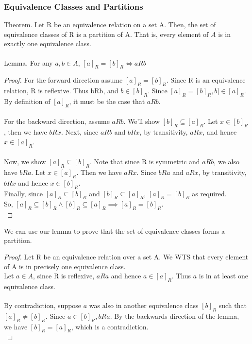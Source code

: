 \documentclass{article}
\begin{document}
\subsubsection{Equivalence Classes and Partitions}
Theorem. Let R be an equivalence relation on a set A. Then, the set of equivalence classes of R is a partition of A. That is, every element of $A$ is in exactly one equivalence class.
\\\\
Lemma. For any $a, b \in A$, $[a]_R = [b]_R \iff aRb$
\begin{proof}
For the forward direction assume $[a]_R = [b]_R$. Since R is an equivalence relation, R is reflexive. Thus bRb, and $b \in [b]_R$. Since $[a]_R = [b]_R, b ] \in [a]_R$. By definition of $[a]_R$, it must be the case that $aRb$.\\
\\
For the backward direction, assume $aRb$. We'll show $[b]_R \subseteq [a]_R.$ Let $x \in [b]_R$, then we have $bRx$. Next, since $aRb$ and $bRx$, by transitivity, $aRx$, and hence $x \in [a]_R$.\\
\\
Now, we show $[a]_R \subseteq [b]_R$. Note that since R is symmetric and $aRb$,  we also have $bRa$. Let $x \in [a]_R$. Then we have $aRx$. Since $bRa$ and $aRx$, by transitivity, $bRx$ and hence $x \in [b]_R$.\\
Finally, since $[a]_R \subseteq [b]_R$ and $[b]_R \subseteq [a]_R$, $[a]_R = [b]_R$ as required.
\\
So, $[a]_R \subseteq [b]_R \land [b]_R \subseteq [a]_R \implies [a]_R = [b]_R$.\\
\end{proof}
We can use our lemma to prove that the set of equivalence classes forms a partition.
\begin{proof}
Let R be an equivalence relation over a set A. We WTS that every element of A is in precisely one equivalence class.\\
Let $a \in A$, since R is reflexive, $aRa$ and hence $a \in [a]_R$. Thus $a$ is in at least one equivalence class.\\
\\
By contradiction, suppose $a$ was also in another equivalence class $[b]_R$ such that $[a]_R \neq [b]_R$. Since $a \in [b]_R, bRa$. By the backwards direction of the lemma, we have $[b]_R = [a]_R$, which is a contradiction.\\
\end{proof}
\end{document}
